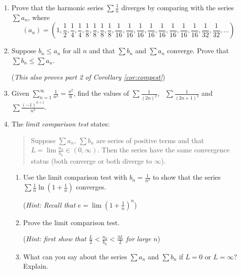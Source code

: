 \begin{exercises}{}{}
\begin{enumerate}
	  
	  \item%
	  Prove that the harmonic series $\sum\frac 1n$ diverges by comparing with the series $\sum a_n$, where
	  \[
	  	(a_n)=\textstyle
	  	\left(1,\frac 12,\frac 14,\frac 14,\frac 18,\frac 18,\frac 18,\frac 18,
	  	\frac 1{16},\frac 1{16},\frac 1{16},\frac 1{16},
	  	\frac 1{16},\frac 1{16},\frac 1{16},\frac 1{16},
	  	\frac 1{32},\frac 1{32},\ldots\right)
	  \]
	  
	  
	  \item Suppose $b_n\le a_n$ for all $n$ and that $\sum b_n$ and $\sum a_n$ converge. Prove that $\sum b_n\le \sum a_n$.\par
	  (\emph{This also proves part 2 of Corollary \ref{cor:compest}})

	
		\item Given $\sum_{n=1}^\infty\frac 1{n^2}=\frac{\pi^2}6$, find the values of $\sum \frac 1{(2n)^2}$, \ $\sum\frac 1{(2n+1)^2}$ and $\sum\frac{(-1)^{n+1}}{n^2}$.

	
	\item The \emph{limit comparison test} states:
  \begin{quote}
  	Suppose $\sum a_n$, $\sum b_n$ are series of positive terms and that $L=\lim\frac{a_n}{b_n}\in(0,\infty)$. Then the series have the same convergence status (both converge or both diverge to $\infty$).
  \end{quote}
  \begin{enumerate}
    \item Use the limit comparison test with $b_n=\frac 1{n^2}$ to show that the series $\sum\frac 1n\ln\left(1+\frac 1n\right)$ converges.\par
    (\emph{Hint: Recall that $e=\lim\left(1+\frac 1n\right)^n$})
    	
    \item Prove the limit comparison test.\par
    (\emph{Hint: first show that $\frac L2<\frac{a_n}{b_n}<\frac{3L}2$ for large $n$})
    	
    \item What can you say about the series $\sum a_n$ and $\sum b_n$ if $L=0$ or $L=\infty$? Explain.
  \end{enumerate}
  
  
	  

\end{enumerate}
\end{exercises}
